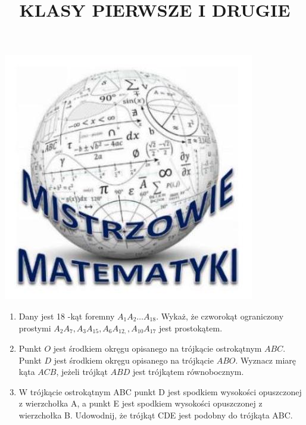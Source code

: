 \documentclass[10pt]{article}
\title{KLASY PIERWSZE I DRUGIE }
\author{}
\date{}
\begin{document}
\maketitle
\begin{center}
\includegraphics[max width=\textwidth]{2024_11_21_aa9c08ec92a5d4e24152g-1}
\end{center}

\begin{enumerate}
  \item Dany jest 18 -kąt foremny \(A_{1} A_{2} \ldots A_{18}\). Wykaż, że czworokąt ograniczony prostymi \(A_{2} A_{7}, A_{3} A_{15}, A_{6} A_{12,}, A_{10} A_{17}\) jest prostokątem.
  \item Punkt \(O\) jest środkiem okręgu opisanego na trójkącie ostrokątnym \(A B C\). Punkt \(D\) jest środkiem okręgu opisanego na trójkącie \(A B O\). Wyznacz miarę kąta \(A C B\), jeżeli trójkąt \(A B D\) jest trójkątem równobocznym.
  \item W trójkącie ostrokątnym ABC punkt D jest spodkiem wysokości opuszczonej z wierzchołka A, a punkt E jest spodkiem wysokości opuszczonej z wierzchołka B. Udowodnij, że trójkąt CDE jest podobny do trójkąta ABC.
\end{enumerate}
\end{document}
